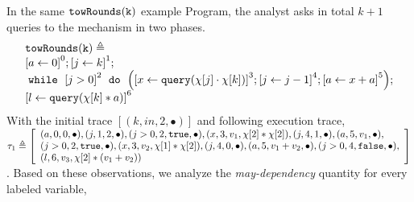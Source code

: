 \begin{example}
    In the same $\mathtt{towRounds(k)}$ example Program,    the analyst asks in total $k+1$ queries to the mechanism in two phases.
    \[         \begin{array}{l}
      \kw{towRounds(k)} \triangleq \\
             \clabel{ \assign{a}{0}}^{0} ;
              \clabel{\assign{j}{k} }^{1} ;\\
              \ewhile ~ \clabel{j > 0}^{2} ~ \edo ~
              \Big(
               \clabel{\assign{x}{\query(\chi[j] \cdot \chi[k])} }^{3}  ;
               \clabel{\assign{j}{j-1}}^{4} ;
              \clabel{\assign{a}{x + a}}^{5}       \Big);\\
              \clabel{\assign{l}{\query(\chi[k]*a)} }^{6}
          \end{array}
          \]    %
    With the initial trace
    $[(k, in, 2, \bullet)]$ and following execution trace, 
    \\
    $
    \trace_1 \triangleq 
    \left[\begin{array}{l}
     (a, 0, 0, \bullet),
    (j, 1, 2, \bullet),
    (j>0, 2, \etrue, \bullet),
    (x, 3, v_1, \chi[2]*\chi[2]),
    (j, 4, 1, \bullet),
    (a, 5, v_1, \bullet),\\
    (j>0, 2, \etrue, \bullet),
    (x, 3, v_2, \chi[1]*\chi[2]),
    (j, 4, 0, \bullet),
    (a, 5, v_1 + v_2, \bullet),
    (j>0, 4, \efalse, \bullet),\\
    (l, 6, v_3, \chi[2]*( v_1 + v_2))
    \end{array} \right]
    $.
    Based on these observations, we analyze the \emph{may-dependency} quantity for every labeled variable,

\end{example}
